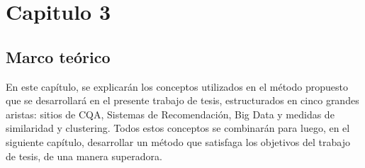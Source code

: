 \chapter*{Capitulo 3}\label{ch:marcoteorico}
\section{Marco teórico}
\noindent En este capítulo, se explicarán los conceptos utilizados en el método propuesto que se desarrollará en el presente trabajo de tesis, estructurados en cinco grandes aristas: sitios de CQA, Sistemas de Recomendación, Big Data y medidas de similaridad y clustering. Todos estos conceptos se combinarán para luego, en el siguiente capítulo, desarrollar un método que satisfaga los objetivos del trabajo de tesis, de una manera superadora.








